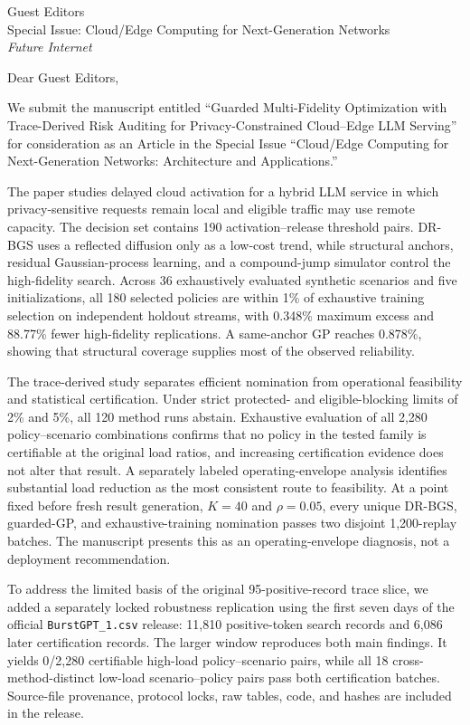 \documentclass[10pt]{letter}
\begin{document}
\begin{letter}{Guest Editors\\Special Issue: Cloud/Edge Computing for Next-Generation Networks\\\emph{Future Internet}}
\opening{Dear Guest Editors,}

We submit the manuscript entitled ``Guarded Multi-Fidelity Optimization with Trace-Derived Risk Auditing for Privacy-Constrained Cloud--Edge LLM Serving'' for consideration as an Article in the Special Issue ``Cloud/Edge Computing for Next-Generation Networks: Architecture and Applications.''

The paper studies delayed cloud activation for a hybrid LLM service in which privacy-sensitive requests remain local and eligible traffic may use remote capacity. The decision set contains 190 activation--release threshold pairs. DR-BGS uses a reflected diffusion only as a low-cost trend, while structural anchors, residual Gaussian-process learning, and a compound-jump simulator control the high-fidelity search. Across 36 exhaustively evaluated synthetic scenarios and five initializations, all 180 selected policies are within 1\% of exhaustive training selection on independent holdout streams, with 0.348\% maximum excess and 88.77\% fewer high-fidelity replications. A same-anchor GP reaches 0.878\%, showing that structural coverage supplies most of the observed reliability.

The trace-derived study separates efficient nomination from operational feasibility and statistical certification. Under strict protected- and eligible-blocking limits of 2\% and 5\%, all 120 method runs abstain. Exhaustive evaluation of all 2,280 policy--scenario combinations confirms that no policy in the tested family is certifiable at the original load ratios, and increasing certification evidence does not alter that result. A separately labeled operating-envelope analysis identifies substantial load reduction as the most consistent route to feasibility. At a point fixed before fresh result generation, $K=40$ and $\rho=0.05$, every unique DR-BGS, guarded-GP, and exhaustive-training nomination passes two disjoint 1,200-replay batches. The manuscript presents this as an operating-envelope diagnosis, not a deployment recommendation.

To address the limited basis of the original 95-positive-record trace slice, we added a separately locked robustness replication using the first seven days of the official \texttt{BurstGPT\_1.csv} release: 11,810 positive-token search records and 6,086 later certification records. The larger window reproduces both main findings. It yields 0/2,280 certifiable high-load policy--scenario pairs, while all 18 cross-method-distinct low-load scenario--policy pairs pass both certification batches. Source-file provenance, protocol locks, raw tables, code, and hashes are included in the release.


\end{letter}
\end{document}
